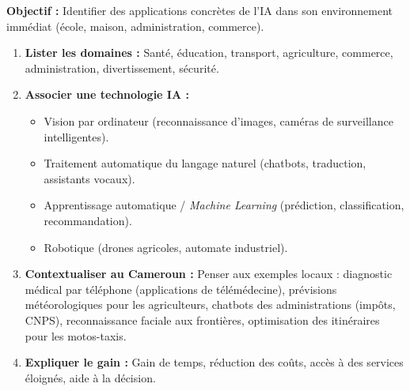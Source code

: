 \documentclass[11pt]{article}
\begin{document}
\begin{methode}
\textbf{Objectif :} Identifier des applications concrètes de l'IA dans son environnement immédiat (école, maison, administration, commerce).
\begin{enumerate}
    \item \textbf{Lister les domaines :} Santé, éducation, transport, agriculture, commerce, administration, divertissement, sécurité.
    \item \textbf{Associer une technologie IA :}
    \begin{itemize}
        \item Vision par ordinateur (reconnaissance d'images, caméras de surveillance intelligentes).
        \item Traitement automatique du langage naturel (chatbots, traduction, assistants vocaux).
        \item Apprentissage automatique / \emph{Machine Learning} (prédiction, classification, recommandation).
        \item Robotique (drones agricoles, automate industriel).
    \end{itemize}
    \item \textbf{Contextualiser au Cameroun :} Penser aux exemples locaux : diagnostic médical par téléphone (applications de télémédecine), prévisions météorologiques pour les agriculteurs, chatbots des administrations (impôts, CNPS), reconnaissance faciale aux frontières, optimisation des itinéraires pour les motos-taxis.
    \item \textbf{Expliquer le gain :} Gain de temps, réduction des coûts, accès à des services éloignés, aide à la décision.
\end{enumerate}
\end{methode}
\end{document}
